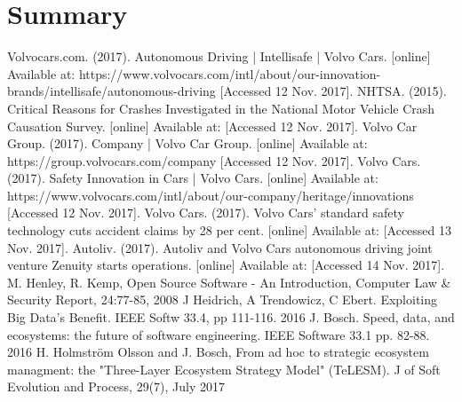 \documentclass[conference]{IEEEtran}
\begin{document}

\section{Summary}


\begin{thebibliography}{00}
	 Volvocars.com. (2017). Autonomous Driving | Intellisafe | Volvo Cars. [online] Available at: https://www.volvocars.com/intl/about/our-innovation-brands/intellisafe/autonomous-driving [Accessed 12 Nov. 2017].
	 NHTSA. (2015). Critical Reasons for Crashes Investigated in the National Motor Vehicle Crash Causation Survey. [online] Available at:  [Accessed 12 Nov. 2017].
	 Volvo Car Group. (2017). Company | Volvo Car Group. [online] Available at: https://group.volvocars.com/company [Accessed 12 Nov. 2017].
	 Volvo Cars. (2017). Safety Innovation in Cars | Volvo Cars. [online] Available at: https://www.volvocars.com/intl/about/our-company/heritage/innovations [Accessed 12 Nov. 2017].
	 Volvo Cars. (2017). Volvo Cars' standard safety technology cuts accident claims by 28 per cent. [online] Available at:  [Accessed 13 Nov. 2017].
	 Autoliv. (2017). Autoliv and Volvo Cars autonomous driving joint venture Zenuity starts operations. [online] Available at:  [Accessed 14 Nov. 2017].
	 M. Henley, R. Kemp, Open Source Software - An Introduction, Computer Law \& Security Report, 24:77-85, 2008
	 J Heidrich, A Trendowicz, C Ebert. Exploiting Big Data's Benefit. IEEE Softw 33.4, pp 111-116. 2016
	 J. Bosch. Speed, data, and ecosystems: the future of software engineering. IEEE Software 33.1 pp. 82-88. 2016
	 H. Holmstr\"{o}m Olsson and J. Bosch, From ad hoc to strategic ecosystem managment: the "Three-Layer Ecosystem Strategy Model" (TeLESM). J of Soft Evolution and Process, 29(7), July 2017

\end{thebibliography}
\end{document}
